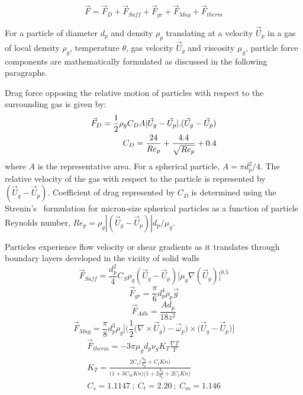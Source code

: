 \documentclass[12pt]{aiaa-tc}
\begin{document}
\begin{equation}
    \vec{F} = \vec{F}_D+\vec{F}_{Saff}+\vec{F}_{gr}+\vec{F}_{Mag}+\vec{F}_{therm}
\end{equation}

For a particle of diameter $d_p$ and density $\rho_p$ translating at a velocity $\vec{U}_p$ in a gas of local density $\rho_g$, temperature $\theta$, gas velocity $\vec{U}_g$ and viscosity $\mu_g$, particle force components are mathematically formulated as discussed in the following paragraphs.

Drag force opposing the relative motion of particles with respect to the surrounding gas is given by:
\begin{equation}
\centering
    \begin{split}
        \vec{F}_D = \frac{1}{2} \rho_g C_D A |\vec{U}_g-\vec{U}_p|.(\vec{U}_g-\vec{U}_p)\\
        C_D = \frac{24}{Re_p}+\frac{4.4}{\sqrt{Re_p}}+0.4
    \end{split}
\end{equation}
where $A$ is the representative area. For a spherical particle, $A = {\pi d_p^2}/{4}$. The relative velocity of the gas with respect to the particle is represented by $(\vec{U}_g-\vec{U}_p)$. Coefficient of drag represented by $C_D$ is determined using the Strenin's~\cite{} formulation for micron-size spherical particles as a function of particle Reynolds number, $Re_p = {\rho_g |(\vec{U}_g-\vec{U}_p)|d_p}/{\mu_g}$.

Particles experience flow velocity or shear gradients as it translates through boundary layers developed in the viciity of solid walls  
\begin{equation}
    \vec{F}_{Saff}=\frac{d_p^2}{4}C_S \rho_g (\vec{U}_g-\vec{U}_p)\Bigg[\mu_g \nabla(\vec{U}_g)\Bigg]^{0.5}
\end{equation}
\begin{equation}
    \vec{F}_{gr} = \frac{\pi}{6} d_p^4 \rho_p \vec{g}
\end{equation}
\begin{equation}
    \vec{F}_{Adh} = \frac{A d_p}{18 z^2}
\end{equation}
\begin{equation}
    \vec{F}_{Mag} = \frac{\pi}{8} d_p^3 \rho_g \Bigg[\bigg(\frac{1}{2}\Big(\nabla \times \vec{U}_g\Big) - \vec{\omega}_p\bigg) \times \bigg(\vec{U}_g -\vec{U}_p \bigg)\Bigg]
\end{equation}
\begin{equation}
\begin{split}
    \vec{F}_{therm} = -3 \pi \mu_g d_p \nu_g K_T \frac{\nabla T}{T}\\
    K_T = \frac{2C_s \Bigg(\frac{k_g}{k_p}+C_t Kn\Bigg)}{\Big(1+3C_m Kn\Big) \Bigg(1+2\frac{k_g}{k_p}+2C_t Kn\bigg)}\\
    C_s = 1.1147~;~C_t = 2.20~;~C_m = 1.146
\end{split}
\end{equation}
\end{document}
